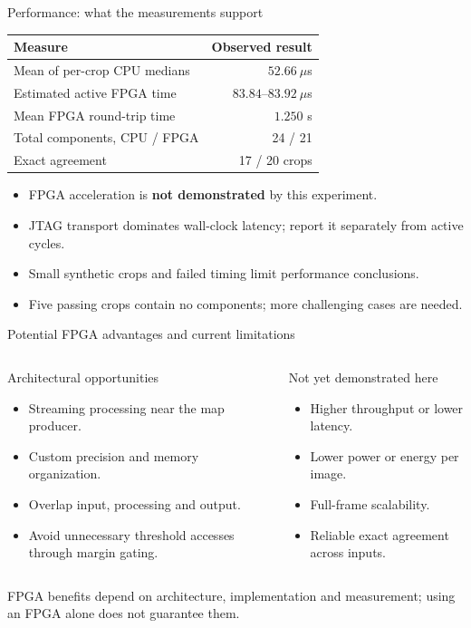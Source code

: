 \documentclass[aspectratio=169,10pt]{beamer}
\begin{document}
\begin{frame}{Performance: what the measurements support}
\begin{center}
\begin{tabular}{lr}
\toprule
Measure & Observed result \\
\midrule
Mean of per-crop CPU medians & $52.66\ \mu$s \\
Estimated active FPGA time & $83.84$--$83.92\ \mu$s \\
Mean FPGA round-trip time & $1.250$ s \\
Total components, CPU / FPGA & 24 / 21 \\
Exact agreement & 17 / 20 crops \\
\bottomrule
\end{tabular}
\end{center}
\begin{itemize}
\item FPGA acceleration is \textbf{not demonstrated} by this experiment.
\item JTAG transport dominates wall-clock latency; report it separately from active cycles.
\item Small synthetic crops and failed timing limit performance conclusions.
\item Five passing crops contain no components; more challenging cases are needed.
\end{itemize}
\end{frame}

\begin{frame}{Potential FPGA advantages and current limitations}
\begin{columns}[T]
\begin{block}{Architectural opportunities}
\begin{itemize}
\item Streaming processing near the map producer.
\item Custom precision and memory organization.
\item Overlap input, processing and output.
\item Avoid unnecessary threshold accesses through margin gating.
\end{itemize}
\end{block}
\begin{alertblock}{Not yet demonstrated here}
\begin{itemize}
\item Higher throughput or lower latency.
\item Lower power or energy per image.
\item Full-frame scalability.
\item Reliable exact agreement across inputs.
\end{itemize}
\end{alertblock}
\end{columns}
\medskip FPGA benefits depend on architecture, implementation and measurement; using an FPGA alone does not guarantee them.
\end{frame}
\end{document}
